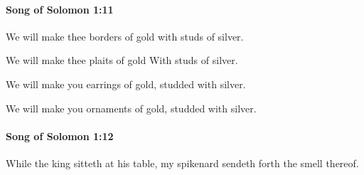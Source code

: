 		\paragraph{Song of Solomon 1:11} %
			\label{SONGOFSOLOMON-1-11}

			We will make thee borders of gold with studs of silver.

			\begin{versebox}
					\item[BHS] 
					\item[LXX] 
					\item[ASV] We will make thee plaits of gold With studs of silver.
					\item[NIV] We will make you earrings of gold, studded with silver.
					\item[NRSV] We will make you ornaments of gold, studded with silver.
			\end{versebox}

		\paragraph{Song of Solomon 1:12} %
			\label{SONGOFSOLOMON-1-12}

			While the king sitteth at his table, my spikenard sendeth forth the smell thereof.

